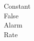 \documentclass[preview]{standalone}
\begin{document}
\begin{center}
\raggedright Constant\\ \vspace{2mm} False\\ \vspace{2mm} Alarm\\ \vspace{2mm} Rate
\end{center}
\end{document}
